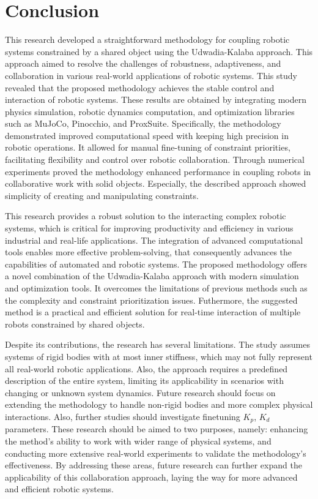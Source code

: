 \chapter{Conclusion}
\label{chap:conclusion}

This research developed a straightforward methodology for 
coupling robotic systems constrained by a shared object using the 
Udwadia-Kalaba approach. This approach aimed to resolve the challenges of 
robustness, adaptiveness, and collaboration in various real-world applications of 
robotic systems. This study revealed that the proposed methodology achieves the 
stable control and interaction of robotic systems. These results are obtained 
by integrating modern physics simulation, robotic dynamics computation, and 
optimization libraries such as MuJoCo, Pinocchio, and ProxSuite. 
Specifically, the methodology demonstrated improved computational speed with 
keeping high precision in robotic operations. It allowed for manual fine-tuning of 
constraint priorities, facilitating flexibility and control over robotic 
collaboration. Through numerical experiments proved the methodology enhanced 
performance in coupling robots in collaborative work with solid objects. 
Especially, the described approach showed simplicity of creating and manipulating 
constraints.

This research provides a robust solution to the interacting complex 
robotic systems, which is critical for improving productivity and efficiency in 
various industrial and real-life applications. The integration of advanced 
computational tools enables more effective problem-solving, that consequently 
advances the capabilities of automated and robotic systems. The proposed 
methodology offers a novel combination of the Udwadia-Kalaba approach 
with modern simulation and optimization tools. It overcomes the limitations of 
previous methods such as the complexity and constraint prioritization issues. 
Futhermore, the suggested method is a practical and efficient solution 
for real-time interaction of multiple robots constrained by shared objects.

Despite its contributions, the research has several limitations. The study assumes 
systems of rigid bodies with at most inner stiffness, which may not fully 
represent all real-world robotic applications. Also, the approach requires a 
predefined description of the entire system, limiting its applicability in 
scenarios with changing or unknown system dynamics. Future research should 
focus on extending the methodology to handle non-rigid bodies and more complex 
physical interactions. Also, further studies should investigate finetuning $K_p$, 
$K_d$ parameters. These research should be aimed to two purposes, namely: 
enhancing the method's ability to work with wider range of physical systems, and 
conducting more extensive real-world experiments to validate 
the methodology's effectiveness. By addressing these areas, future research can 
further expand the applicability of this collaboration 
approach, laying the way for more advanced and efficient robotic systems.
